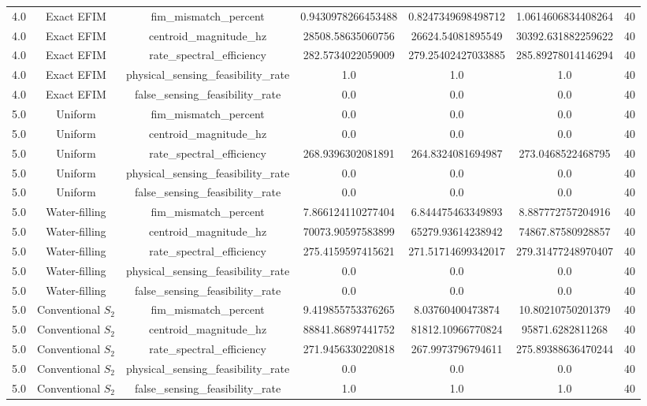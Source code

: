 \begin{table}[t]
\begin{tabular}{lcccccc}
4.0 & Exact EFIM & fim_mismatch_percent & 0.9430978266453488 & 0.8247349698498712 & 1.0614606834408264 & 40 \\
4.0 & Exact EFIM & centroid_magnitude_hz & 28508.58635060756 & 26624.54081895549 & 30392.631882259622 & 40 \\
4.0 & Exact EFIM & rate_spectral_efficiency & 282.5734022059009 & 279.25402427033885 & 285.89278014146294 & 40 \\
4.0 & Exact EFIM & physical_sensing_feasibility_rate & 1.0 & 1.0 & 1.0 & 40 \\
4.0 & Exact EFIM & false_sensing_feasibility_rate & 0.0 & 0.0 & 0.0 & 40 \\
5.0 & Uniform & fim_mismatch_percent & 0.0 & 0.0 & 0.0 & 40 \\
5.0 & Uniform & centroid_magnitude_hz & 0.0 & 0.0 & 0.0 & 40 \\
5.0 & Uniform & rate_spectral_efficiency & 268.9396302081891 & 264.8324081694987 & 273.0468522468795 & 40 \\
5.0 & Uniform & physical_sensing_feasibility_rate & 0.0 & 0.0 & 0.0 & 40 \\
5.0 & Uniform & false_sensing_feasibility_rate & 0.0 & 0.0 & 0.0 & 40 \\
5.0 & Water-filling & fim_mismatch_percent & 7.866124110277404 & 6.844475463349893 & 8.887772757204916 & 40 \\
5.0 & Water-filling & centroid_magnitude_hz & 70073.90597583899 & 65279.93614238942 & 74867.87580928857 & 40 \\
5.0 & Water-filling & rate_spectral_efficiency & 275.4159597415621 & 271.51714699342017 & 279.31477248970407 & 40 \\
5.0 & Water-filling & physical_sensing_feasibility_rate & 0.0 & 0.0 & 0.0 & 40 \\
5.0 & Water-filling & false_sensing_feasibility_rate & 0.0 & 0.0 & 0.0 & 40 \\
5.0 & Conventional $S_2$ & fim_mismatch_percent & 9.419855753376265 & 8.03760400473874 & 10.80210750201379 & 40 \\
5.0 & Conventional $S_2$ & centroid_magnitude_hz & 88841.86897441752 & 81812.10966770824 & 95871.6282811268 & 40 \\
5.0 & Conventional $S_2$ & rate_spectral_efficiency & 271.9456330220818 & 267.9973796794611 & 275.89388636470244 & 40 \\
5.0 & Conventional $S_2$ & physical_sensing_feasibility_rate & 0.0 & 0.0 & 0.0 & 40 \\
5.0 & Conventional $S_2$ & false_sensing_feasibility_rate & 1.0 & 1.0 & 1.0 & 40 \\

\end{tabular}
\end{table}

